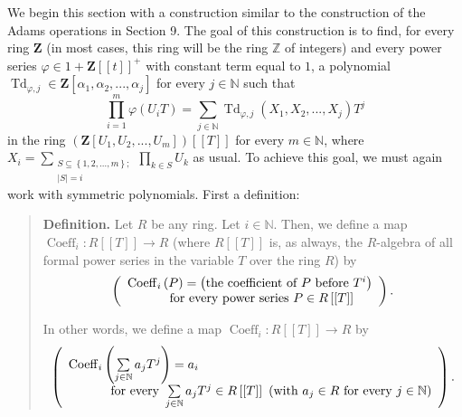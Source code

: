 \documentclass[numbers=enddot,12pt,final,onecolumn,notitlepage]{scrartcl}%
\begin{document}
We begin this section with a construction similar to the construction of the
Adams operations in Section 9. The goal of this construction is to find, for
every ring $\mathbf{Z}$ (in most cases, this ring will be the ring
$\mathbb{Z}$ of integers) and every power series $\varphi\in1+\mathbf{Z}%
\left[  \left[  t\right]  \right]  ^{+}$ with constant term equal to $1$, a
polynomial $\operatorname*{Td}_{\varphi,j}\in\mathbf{Z}\left[  \alpha
_{1},\alpha_{2},...,\alpha_{j}\right]  $ for every $j\in\mathbb{N}$ such that
\[
\prod\limits_{i=1}^{m}\varphi\left(  U_{i}T\right)  =\sum_{j\in\mathbb{N}%
}\operatorname*{Td}\nolimits_{\varphi,j}\left(  X_{1},X_{2},...,X_{j}\right)
T^{j}%
\]
in the ring $\left(  \mathbf{Z}\left[  U_{1},U_{2},...,U_{m}\right]  \right)
\left[  \left[  T\right]  \right]  $ for every $m\in\mathbb{N}$, where
$X_{i}=\sum\limits_{\substack{S\subseteq\left\{  1,2,...,m\right\}
;\\\left\vert S\right\vert =i}}\prod\limits_{k\in S}U_{k}$ as usual. To
achieve this goal, we must again work with symmetric polynomials. First a definition:

\begin{quote}
\textbf{Definition.} Let $R$ be any ring. Let $i\in\mathbb{N}$. Then, we
define a map $\operatorname*{Coeff}\nolimits_{i}:R\left[  \left[  T\right]
\right]  \rightarrow R$ (where $R\left[  \left[  T\right]  \right]  $ is, as
always, the $R$-algebra of all formal power series in the variable $T$ over
the ring $R$) by%
\[
\left(
\begin{array}
[c]{l}%
\operatorname*{Coeff}\nolimits_{i}\left(  P\right)  =\left(  \text{the
coefficient of }P\text{ before }T^{i}\right) \\
\ \ \ \ \ \ \ \ \ \ \text{for every power series }P\in R\left[  \left[
T\right]  \right]
\end{array}
\right)  .
\]


In other words, we define a map $\operatorname*{Coeff}\nolimits_{i}:R\left[
\left[  T\right]  \right]  \rightarrow R$ by%
\[
\left(
\begin{array}
[c]{l}%
\operatorname*{Coeff}\nolimits_{i}\left(  \sum\limits_{j\in\mathbb{N}}%
a_{j}T^{j}\right)  =a_{i}\\
\ \ \ \ \ \ \ \ \ \ \text{for every }\sum\limits_{j\in\mathbb{N}}a_{j}T^{j}\in
R\left[  \left[  T\right]  \right]  \text{ (with }a_{j}\in R\text{ for every
}j\in\mathbb{N}\text{)}%
\end{array}
\right)  .
\]



\end{quote}
\end{document}
